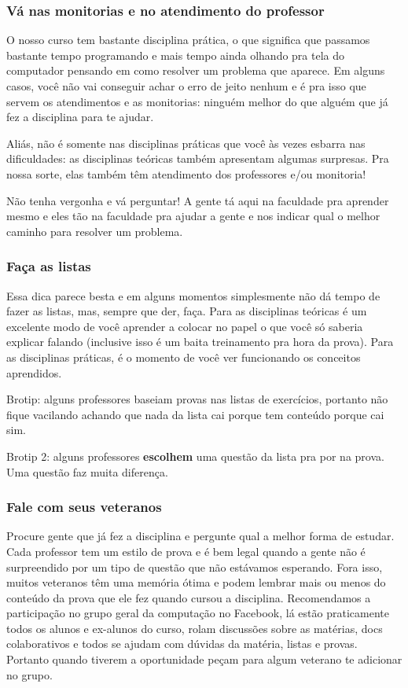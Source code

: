 \subsubsection{Vá nas monitorias e no atendimento do professor}
O nosso curso tem bastante disciplina prática, o que significa que passamos bastante tempo programando e mais tempo ainda olhando pra tela do computador pensando em como resolver um problema que aparece. Em alguns casos, você não vai conseguir achar o erro de jeito nenhum e é pra isso que servem os atendimentos e as monitorias: ninguém melhor do que alguém que já fez a disciplina para te ajudar.

Aliás, não é somente nas disciplinas práticas que você às vezes esbarra nas dificuldades: as disciplinas teóricas também apresentam algumas surpresas. Pra nossa sorte, elas também têm atendimento dos professores e/ou monitoria!

Não tenha vergonha e vá perguntar! A gente tá aqui na faculdade pra aprender mesmo e eles tão na faculdade pra ajudar a gente e nos indicar qual o melhor caminho para resolver um problema.

\subsubsection{Faça as listas}
Essa dica parece besta e em alguns momentos simplesmente não dá tempo de fazer as listas, mas, sempre que der, faça. Para as disciplinas teóricas é um excelente modo de você aprender a colocar no papel o que você só saberia explicar falando (inclusive isso é um baita treinamento pra hora da prova). Para as disciplinas práticas, é o momento de você ver funcionando os conceitos aprendidos.

Brotip: alguns professores baseiam provas nas listas de exercícios, portanto não fique vacilando achando que nada da lista cai porque tem conteúdo porque cai sim.

Brotip 2: alguns professores \textbf{escolhem} uma questão da lista pra por na prova. Uma questão faz muita diferença.

\subsubsection{Fale com seus veteranos}
Procure gente que já fez a disciplina e pergunte qual a melhor forma de estudar. Cada professor tem um estilo de prova e é bem legal quando a gente não é surpreendido por um tipo de questão que não estávamos esperando. Fora isso, muitos veteranos têm uma memória ótima e podem lembrar mais ou menos do conteúdo da prova que ele fez quando cursou a disciplina.
Recomendamos a participação no grupo geral da computação no Facebook, lá estão praticamente todos os alunos e ex-alunos do curso, rolam discussões sobre as matérias, docs colaborativos e todos se ajudam com dúvidas da matéria, listas e provas. Portanto quando tiverem a oportunidade peçam para algum veterano te adicionar no grupo.

